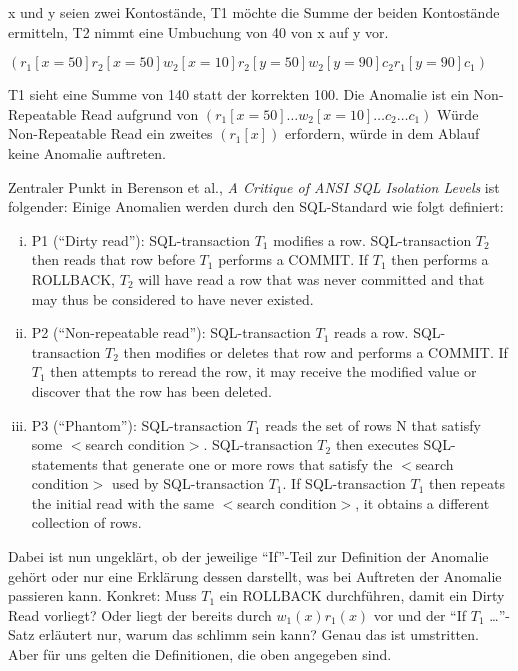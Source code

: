 \begin{enumerate}[a)]
\begin{note}
x und y seien zwei Kontostände, T1 möchte die Summe der beiden Kontostände ermitteln, T2 nimmt eine Umbuchung von 40 von x auf y vor.

$(r_1[x=50] r_2[x=50] w_2[x=10] r_2[y=50] w_2[y=90] c_2 r_1[y=90] c_1)$

T1 sieht eine Summe von 140 statt der korrekten 100. Die Anomalie ist ein Non-Repeatable Read aufgrund von $(r_1[x=50] \ldots w_2[x=10] \ldots c_2 \ldots c_1)$
Würde Non-Repeatable Read ein zweites $(r_1[x])$ erfordern, würde in dem Ablauf keine Anomalie auftreten.

Zentraler Punkt in Berenson et al., \emph{A Critique of ANSI SQL Isolation Levels} ist folgender:
Einige Anomalien werden durch den SQL-Standard wie folgt definiert:
\begin{enumerate}[i)]
  \item P1 ("`Dirty read"'): SQL-transaction $T_1$ modifies a row. SQL-transaction $T_2$ then reads that row before $T_1$ performs a COMMIT. If $T_1$ then performs a ROLLBACK, $T_2$ will have read a row that was never committed and that may thus be considered to have never existed.

  \item P2 ("`Non-repeatable read"'): SQL-transaction $T_1$ reads a row. SQL-transaction $T_2$ then modifies or deletes that row and performs a COMMIT. If $T_1$ then attempts to reread the row, it may receive the modified value or discover that the row has been deleted.

  \item P3 ("`Phantom"'): SQL-transaction $T_1$ reads the set of rows N that satisfy some $<$search condition$>$. SQL-transaction $T_2$ then executes SQL-statements that generate one or more rows that satisfy the $<$search condition$>$ used by SQL-transaction $T_1$. If SQL-transaction $T_1$ then repeats the initial read with the same $<$search condition$>$, it obtains a different collection of rows.
\end{enumerate}

Dabei ist nun ungeklärt, ob der jeweilige "`If"'-Teil zur Definition der Anomalie gehört oder nur eine Erklärung dessen darstellt, was bei Auftreten der Anomalie passieren kann. Konkret: Muss $T_1$ ein ROLLBACK durchführen, damit ein Dirty Read vorliegt? Oder liegt der bereits durch $w_1(x) r_1(x)$ vor und der "`If $T_1$ \ldots "'-Satz erläutert nur, warum das schlimm sein kann? Genau das ist umstritten. Aber für uns gelten die Definitionen, die oben angegeben sind.
\end{note}


\end{enumerate}
